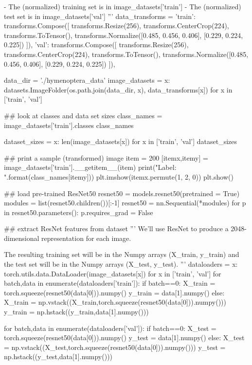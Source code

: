 - The (normalized) training set is in image_datasets['train']
- The (normalized) test set is in image_datasets['val']
'''
data_transforms = {
    'train': transforms.Compose([
        transforms.Resize(256),
        transforms.CenterCrop(224),
        transforms.ToTensor(),
        transforms.Normalize([0.485, 0.456, 0.406], [0.229, 0.224, 0.225])
    ]),
    'val': transforms.Compose([
        transforms.Resize(256),
        transforms.CenterCrop(224),
        transforms.ToTensor(),
        transforms.Normalize([0.485, 0.456, 0.406], [0.229, 0.224, 0.225])
    ]),
}

data_dir = './hymenoptera_data'
image_datasets = {x: datasets.ImageFolder(os.path.join(data_dir, x), data_transforms[x])
                  for x in ['train', 'val']}

## look at classes and data set sizes
class_names = image_datasets['train'].classes
class_names

dataset_sizes = {x: len(image_datasets[x]) for x in ['train', 'val']}
dataset_sizes

## print a sample (transformed) image
item = 200
[itemx,itemy] = image_datasets['train'].__getitem__(item)
print("Label: {}\n".format(class_names[itemy]))
plt.imshow(itemx.permute(1, 2, 0))
plt.show()

## load pre-trained ResNet50
resnet50 = models.resnet50(pretrained = True)
modules = list(resnet50.children())[:-1]
resnet50 = nn.Sequential(*modules)
for p in resnet50.parameters():
    p.requires_grad = False

## extract ResNet features from dataset
'''
We'll use ResNet to produce a 2048-dimensional representation for each image.

The resulting training set will be in the Numpy arrays (X_train, y_train) and the test set will be in the Numpy arrays (X_test, y_test).
'''
dataloaders = {x: torch.utils.data.DataLoader(image_datasets[x])
              for x in ['train', 'val']}
for batch,data in enumerate(dataloaders['train']):
    if batch==0:
        X_train = torch.squeeze(resnet50(data[0])).numpy()
        y_train = data[1].numpy()
    else:
        X_train = np.vstack((X_train,torch.squeeze(resnet50(data[0])).numpy()))
        y_train = np.hstack((y_train,data[1].numpy()))


for batch,data in enumerate(dataloaders['val']):
    if batch==0:
        X_test = torch.squeeze(resnet50(data[0])).numpy()
        y_test = data[1].numpy()
    else:
        X_test = np.vstack((X_test,torch.squeeze(resnet50(data[0])).numpy()))
        y_test = np.hstack((y_test,data[1].numpy()))

